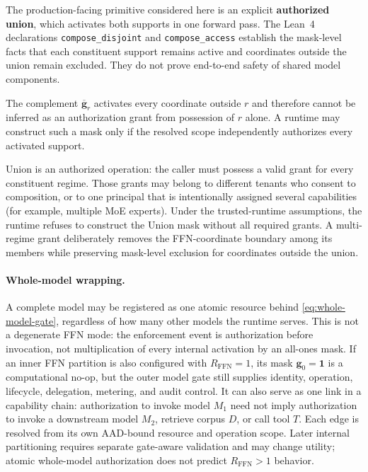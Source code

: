 \documentclass[11pt,a4paper]{article}
\newcommand{\bg}{\mathbf{g}}
\begin{document}
The production-facing primitive considered here is an explicit
\textbf{authorized union}, which activates both supports in one forward
pass.  The Lean~4 declarations \texttt{compose\_disjoint} and
\texttt{compose\_access} establish the mask-level facts that each
constituent support remains active and coordinates outside the union
remain excluded.  They do not prove end-to-end safety of shared model
components.

The complement $\overline{\bg}_r$ activates every coordinate outside
$r$ and therefore cannot be inferred as an authorization grant from
possession of $r$ alone.  A runtime may construct such a mask only if
the resolved scope independently authorizes every activated support.

Union is an authorized operation: the caller must possess a valid
grant for every constituent regime.  Those grants may belong to
different tenants who consent to composition, or to one principal
that is intentionally assigned several capabilities (for example,
multiple MoE experts).  Under the trusted-runtime assumptions, the
runtime refuses to construct the Union mask without all required
grants.  A multi-regime grant deliberately removes the FFN-coordinate
boundary among its members while preserving mask-level exclusion for
coordinates outside the union.

\paragraph{Whole-model wrapping.}
A complete model may be registered as one atomic resource behind
\eqref{eq:whole-model-gate}, regardless of how many other models the
runtime serves.  This is not a degenerate FFN mode: the enforcement
event is authorization before invocation, not multiplication of every
internal activation by an all-ones mask.  If an inner FFN partition is
also configured with $R_{\mathrm{FFN}}{=}1$, its mask
$\bg_0=\mathbf 1$ is a computational no-op, but the outer model gate
still supplies identity, operation, lifecycle, delegation, metering,
and audit control.  It can also serve as one link in a capability
chain: authorization to invoke model $M_1$ need not imply authorization
to invoke a downstream model $M_2$, retrieve corpus $D$, or call tool
$T$.  Each edge is resolved from its own AAD-bound resource and
operation scope.
Later internal partitioning requires separate gate-aware validation
and may change utility; atomic whole-model authorization does not
predict $R_{\mathrm{FFN}}>1$ behavior.
\end{document}

